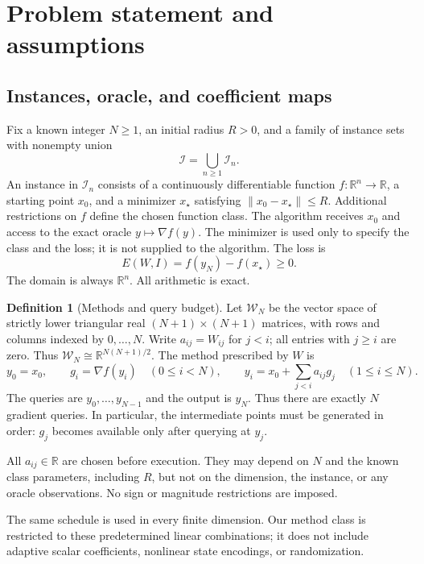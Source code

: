 \documentclass[11pt]{article}
\numberwithin{equation}{section}
\theoremstyle{definition}
\newtheorem{definition}[theorem]{Definition}
\newcommand{\R}{\mathbb R}
\newcommand{\W}{\mathcal W_N}
\begin{document}
\section{Problem statement and assumptions}
\label{sec:problem}
\subsection{Instances, oracle, and coefficient maps}
Fix a known integer $N\ge1$, an initial radius $R>0$, and a family of instance sets with nonempty union
\[
 \mathscr I=\bigcup_{n\ge1}\mathscr I_n.
\]
An instance in $\mathscr I_n$ consists of a continuously differentiable function $f:\R^n\to\R$, a starting point $x_0$, and a minimizer $x_\star$ satisfying $\|x_0-x_\star\|\le R$. Additional restrictions on $f$ define the chosen function class. The algorithm receives $x_0$ and access to the exact oracle $y\mapsto\nabla f(y)$. The minimizer is used only to specify the class and the loss; it is not supplied to the algorithm. The loss is
\[
 E(W,I)=f(y_N)-f(x_\star)\ge0.
\]
The domain is always $\R^n$. All arithmetic is exact.

\begin{definition}[Methods and query budget]\label{def:methods}
Let $\W$ be the vector space of strictly lower triangular real $(N+1)\times(N+1)$ matrices, with rows and columns indexed by $0,\ldots,N$. Write $a_{ij}=W_{ij}$ for $j<i$; all entries with $j\ge i$ are zero. Thus $\W\cong\R^{N(N+1)/2}$. The method prescribed by $W$ is
\begin{equation}
 y_0=x_0,\qquad g_i=\nabla f(y_i)\quad(0\le i<N),\qquad
 y_i=x_0+\sum_{j<i}a_{ij}g_j\quad(1\le i\le N).
 \label{eq:history}
\end{equation}
The queries are $y_0,\ldots,y_{N-1}$ and the output is $y_N$. Thus there are exactly $N$ gradient queries. In particular, the intermediate points must be generated in order: $g_j$ becomes available only after querying at $y_j$.

All $a_{ij}\in\R$ are chosen before execution. They may depend on $N$ and the known class parameters, including $R$, but not on the dimension, the instance, or any oracle observations. No sign or magnitude restrictions are imposed.
\end{definition}

The same schedule is used in every finite dimension. Our method class is restricted to these predetermined linear combinations; it does not include adaptive scalar coefficients, nonlinear state encodings, or randomization.
\end{document}
